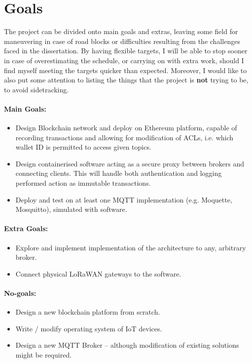 \documentclass[a4paper,12pt]{article}
\begin{document}
\section*{Goals}

The project can be divided onto main goals and extras, leaving some field for maneuvering in case of road blocks or difficulties resulting from the challenges faced in the dissertation. By having flexible targets, I will be able to stop sooner in case of overestimating the schedule, or carrying on with extra work, should I find myself meeting the targets quicker than expected. Moreover, I would like to also put some attention to listing the things that the project is \textbf{not} trying to be, to avoid sidetracking.

\paragraph{Main Goals:}
\begin{itemize}
  \item Design Blockchain network and deploy on Ethereum platform, capable of recording transactions and allowing for modification of ACLs, i.e. which wallet ID is permitted to access given topics.
  \item Design containerised software acting as a secure proxy between brokers and connecting clients. This will handle both authentication and logging performed action as immutable transactions.
  \item Deploy and test on at least one MQTT implementation (e.g. Moquette, Mosquitto), simulated with software.
\end{itemize}

\paragraph{Extra Goals:}
\begin{itemize}
  \item Explore and implement implementation of the architecture to any, arbitrary broker.
  \item Connect physical LoRaWAN gateways to the software.
\end{itemize}

\paragraph{No-goals:}
\begin{itemize}
  \item Design a new blockchain platform from scratch.
  \item Write / modify operating system of IoT devices.
  \item Design a new MQTT Broker -- although modification of existing solutions might be required.
\end{itemize}
\end{document}
